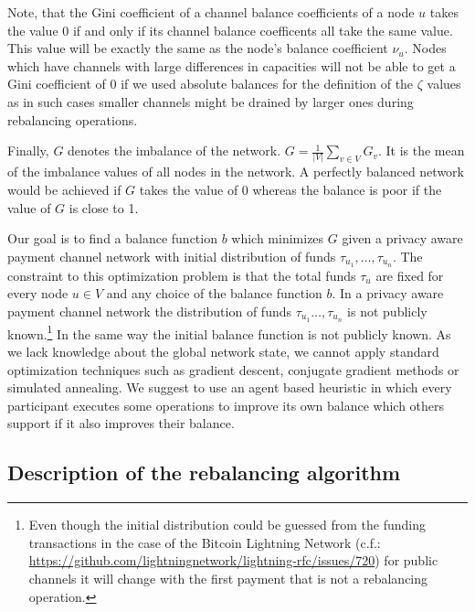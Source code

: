 \documentclass[a4paper]{paper}
\begin{document}
Note, that the Gini coefficient of a channel balance coefficients of a node $u$ takes the value $0$ if and only if its channel balance coefficents all take the same value.
This value will be exactly the same as the node's balance coefficient $\nu_u$.
Nodes which have channels with large differences in capacities will not be able to get a Gini coefficient of 0 if we used absolute balances for the definition of the $\zeta$ values as in such cases smaller channels might be drained by larger ones during rebalancing operations.

Finally, $G$ denotes the imbalance of the network. $G = \displaystyle{\frac{1}{|V|}\sum_{v\in V}G_v}$. It is the mean of the imbalance values of all nodes in the network.
A perfectly balanced network would be achieved if $G$ takes the value of $0$ whereas the balance is poor if the value of $G$ is close to 1.

Our goal is to find a balance function $b$ which minimizes $G$ given a privacy aware payment channel network with initial distribution of funds $\tau_{u_1},\dots,\tau_{u_n}$.
The constraint to this optimization problem is that the total funds $\tau_u$ are fixed for every node $u \in V$ and any choice of the balance function $b$.
In a privacy aware payment channel network the distribution of funds $\tau_{u_1}\dots,\tau_{u_n}$ is not publicly known.\footnote{Even though the initial distribution could be guessed from the funding transactions in the case of the Bitcoin Lightning Network (c.f.: \url{https://github.com/lightningnetwork/lightning-rfc/issues/720}) for public channels it will change with the first payment that is not a rebalancing operation.}
In the same way the initial balance function is not publicly known.
As we lack knowledge about the global network state, we cannot apply standard optimization techniques such as gradient descent, conjugate gradient methods or simulated annealing.
We suggest to use an agent based heuristic in which every participant executes some operations to improve its own balance which others support if it also improves their balance.

\subsection{Description of the rebalancing algorithm}
\label{sec:Algorithm}
\end{document}

